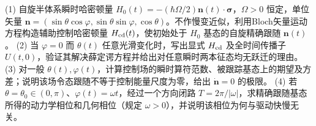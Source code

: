(1) 自旋半体系瞬时哈密顿量 \(H_0(t)=-(\hbar\Omega/2)\boldsymbol n(t)\cdot\boldsymbol\sigma\)，\(\Omega>0\) 恒定，单位矢量 \(\boldsymbol n=(\sin\theta\cos\varphi,\sin\theta\sin\varphi,\cos\theta)\)。不作慢变近似，利用Bloch矢量运动方程构造辅助控制哈密顿量 \(H_{\rm cd}(t)\)，使初始处于 \(H_0\) 基态的自旋精确跟随 \(\boldsymbol n(t)\)。
(2) 当 \(\varphi=0\) 而 \(\theta(t)\) 任意光滑变化时，写出显式 \(H_{\rm cd}\) 及全时间传播子 \(U(t,0)\)，验证其解决薛定谔方程并给出对任意瞬时两本征态均无跃迁的理由。
(3) 对一般 \(\theta(t),\varphi(t)\)，计算控制场的瞬时算符范数、被跟踪基态上的期望及方差；说明该场令态跟随不等于控制能量尺度为零，给出 \(\dot{\boldsymbol n}=0\) 的极限。
(4) 若 \(\theta=\theta_0\in(0,\pi)\)、\(\varphi(t)=\omega t\)，经过一个方向闭路 \(T=2\pi/|\omega|\)，求精确跟随基态所得的动力学相位和几何相位（规定 \(\omega>0\)），并说明该相位为何与驱动快慢无关。
